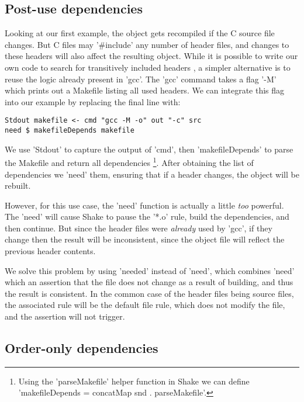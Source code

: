 \subsection{Post-use dependencies}

Looking at our first example, the object gets recompiled if the C source file changes. But C files may \lst'#include' any number of header files, and changes to these headers will also affect the resulting object. While it is possible to write our own code to search for transitively included headers \cite[\S6.4]{shake}, a simpler alternative is to reuse the logic already present in \lst'gcc'. The \lst'gcc' command takes a flag \lst'-M' which prints out a Makefile listing all used headers. We can integrate this flag into our example by replacing the final line with:

\begin{lstlisting}
Stdout makefile <- cmd "gcc -M -o" out "-c" src
need $ makefileDepends makefile
\end{lstlisting}

\noindent We use \lst'Stdout' to capture the output of \lst'cmd', then \lst'makefileDepends' to parse the Makefile and return all dependencies \footnote{Using the \lst'parseMakefile' helper function in Shake we can define \lst'makefileDepends = concatMap snd . parseMakefile'.}. After obtaining the list of dependencies we \lst'need' them, ensuring that if a header changes, the object will be rebuilt.

However, for this use case, the \lst'need' function is actually a little \emph{too} powerful. The \lst'need' will cause Shake to pause the \lst'*.o' rule, build the dependencies, and then continue. But since the header files were \emph{already} used by \lst'gcc', if they change then the result will be inconsistent, since the object file will reflect the previous header contents.

We solve this problem by using \lst'needed' instead of \lst'need', which combines \lst'need' which an assertion that the file does not change as a result of building, and thus the result is consistent. In the common case of the header files being source files, the associated rule will be the default file rule, which does not modify the file, and the assertion will not trigger.

\subsection{Order-only dependencies}

